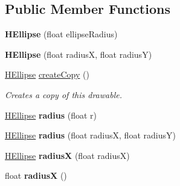 \subsection*{Public Member Functions}
\begin{DoxyCompactItemize}
\item 
\hypertarget{classhype_1_1drawable_1_1_h_ellipse_a0569df002abe55d7296702bd534b4e5a}{{\bfseries H\-Ellipse} (float ellipse\-Radius)}\label{classhype_1_1drawable_1_1_h_ellipse_a0569df002abe55d7296702bd534b4e5a}

\item 
\hypertarget{classhype_1_1drawable_1_1_h_ellipse_ac8ad625849845ef75503bccedcf101c3}{{\bfseries H\-Ellipse} (float radius\-X, float radius\-Y)}\label{classhype_1_1drawable_1_1_h_ellipse_ac8ad625849845ef75503bccedcf101c3}

\item 
\hyperlink{classhype_1_1drawable_1_1_h_ellipse}{H\-Ellipse} \hyperlink{classhype_1_1drawable_1_1_h_ellipse_adbad5480f5cb60d2aa3f767d2f93067b}{create\-Copy} ()
\begin{DoxyCompactList}\small\item\em Creates a copy of this drawable. \end{DoxyCompactList}\item 
\hypertarget{classhype_1_1drawable_1_1_h_ellipse_ac88bf1d35903977db5f7920d5f4f0dd5}{\hyperlink{classhype_1_1drawable_1_1_h_ellipse}{H\-Ellipse} {\bfseries radius} (float r)}\label{classhype_1_1drawable_1_1_h_ellipse_ac88bf1d35903977db5f7920d5f4f0dd5}

\item 
\hypertarget{classhype_1_1drawable_1_1_h_ellipse_a2c4f12318989c62c07ec22720c67046b}{\hyperlink{classhype_1_1drawable_1_1_h_ellipse}{H\-Ellipse} {\bfseries radius} (float radius\-X, float radius\-Y)}\label{classhype_1_1drawable_1_1_h_ellipse_a2c4f12318989c62c07ec22720c67046b}

\item 
\hypertarget{classhype_1_1drawable_1_1_h_ellipse_a5f5c0f36af4d0ad76db8d61a6e9fdac0}{\hyperlink{classhype_1_1drawable_1_1_h_ellipse}{H\-Ellipse} {\bfseries radius\-X} (float radius\-X)}\label{classhype_1_1drawable_1_1_h_ellipse_a5f5c0f36af4d0ad76db8d61a6e9fdac0}

\item 
\hypertarget{classhype_1_1drawable_1_1_h_ellipse_a49dcb2bab0110b7b4926b3d48fe82529}{float {\bfseries radius\-X} ()}\label{classhype_1_1drawable_1_1_h_ellipse_a49dcb2bab0110b7b4926b3d48fe82529}


\end{DoxyCompactItemize}
